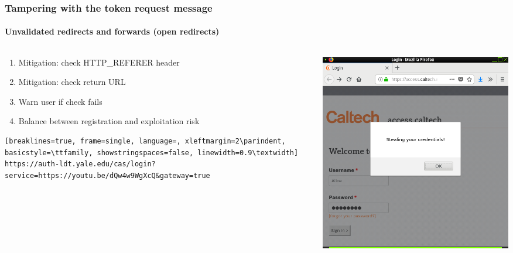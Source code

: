 \documentclass[handout, aspectratio=169, notes=hide]{beamer}
\begin{document}

\begin{frame}[fragile]
\frametitle{Tampering with the token request message}
\framesubtitle{Unvalidated redirects and forwards (open redirects)}
\setlength{\parskip}{1.0em}
\begin{columns}[T]
\begin{column}[T]{0.7\textwidth}	
\setlength{\parskip}{1.0em}

\begin{enumerate}
\setlength{\parskip}{1.0em}
\item Mitigation: check HTTP\_REFERER header
\item Mitigation: check return URL
\item Warn user if check fails
\item Balance between registration and exploitation risk
\end{enumerate}
\begin{lstlisting}[breaklines=true, frame=single, language=, xleftmargin=2\parindent, basicstyle=\ttfamily, showstringspaces=false, linewidth=0.9\textwidth]
https://auth-ldt.yale.edu/cas/login?service=https://youtu.be/dQw4w9WgXcQ&gateway=true
\end{lstlisting}
\end{column}

\begin{column}[T]{0.3\textwidth}
\vspace{0.5cm}
\includegraphics[width=1.2\textwidth,right]{caltech_alice}
\end{column}
\end{columns}
\end{frame}
\note{
}
\end{document}
